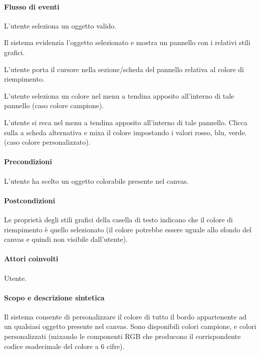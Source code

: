 \paragraph{Flusso di eventi}
\begin{elenconumerato}[\textbf{}]{\subsubsecindent}
\item L'utente seleziona un oggetto valido.
\item Il sistema evidenzia l'oggetto selezionato e mostra un pannello con i relativi stili grafici.
\item L'utente porta il cursore nella sezione/scheda del pannello relativa al colore di riempimento.
\item  L'utente seleziona un colore  nel menu a tendina apposito all'interno di tale pannello (caso colore campione).
\item L'utente si reca nel menu a tendina apposito all'interno di tale pannello. Clicca sulla a scheda alternativa e mixa il colore impostando i valori rosso, blu, verde. (caso colore personalizzato).
\end{elenconumerato}
\paragraph{Precondizioni}L'utente ha scelto un oggetto colorabile presente nel canvas.
\paragraph{Postcondizioni}Le propriet\` a degli stili grafici della casella di testo indicano che il colore di riempimento \` e  quello selezionato (il colore potrebbe essere uguale allo sfondo del canvas e quindi non visibile dall'utente).


\paragraph{Attori coinvolti} Utente.
\paragraph{Scopo e descrizione sintetica} Il sistema consente di personalizzare il colore di tutto il bordo appartenente ad un qualsiasi oggetto presente nel canvas.
Sono disponibili colori campione, e colori personalizzati (mixando le componenti RGB che producono il corrispondente codice esadecimale del colore a 6 cifre).
